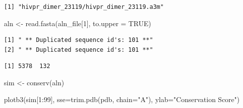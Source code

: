 \documentclass[
  letterpaper,
  DIV=11,
  numbers=noendperiod]{scrartcl}
\newenvironment{Shaded}{\begin{snugshade}}{\end{snugshade}}
\newcommand{\AttributeTok}[1]{\textcolor[rgb]{0.40,0.45,0.13}{#1}}
\newcommand{\ConstantTok}[1]{\textcolor[rgb]{0.56,0.35,0.01}{#1}}
\newcommand{\DecValTok}[1]{\textcolor[rgb]{0.68,0.00,0.00}{#1}}
\newcommand{\FunctionTok}[1]{\textcolor[rgb]{0.28,0.35,0.67}{#1}}
\newcommand{\NormalTok}[1]{\textcolor[rgb]{0.00,0.23,0.31}{#1}}
\newcommand{\OtherTok}[1]{\textcolor[rgb]{0.00,0.23,0.31}{#1}}
\newcommand{\SpecialCharTok}[1]{\textcolor[rgb]{0.37,0.37,0.37}{#1}}
\newcommand{\StringTok}[1]{\textcolor[rgb]{0.13,0.47,0.30}{#1}}
\begin{document}
\begin{Shaded}
\end{Shaded}

\begin{verbatim}
[1] "hivpr_dimer_23119/hivpr_dimer_23119.a3m"
\end{verbatim}

\begin{Shaded}
\begin{Highlighting}[]
\NormalTok{aln }\OtherTok{\textless{}{-}} \FunctionTok{read.fasta}\NormalTok{(aln\_file[}\DecValTok{1}\NormalTok{], }\AttributeTok{to.upper =} \ConstantTok{TRUE}\NormalTok{)}
\end{Highlighting}
\end{Shaded}

\begin{verbatim}
[1] " ** Duplicated sequence id's: 101 **"
[2] " ** Duplicated sequence id's: 101 **"
\end{verbatim}

\begin{Shaded}
\end{Shaded}

\begin{verbatim}
[1] 5378  132
\end{verbatim}

\begin{Shaded}
\begin{Highlighting}[]
\NormalTok{sim }\OtherTok{\textless{}{-}} \FunctionTok{conserv}\NormalTok{(aln)}
\end{Highlighting}
\end{Shaded}

\begin{Shaded}
\begin{Highlighting}[]
\FunctionTok{plotb3}\NormalTok{(sim[}\DecValTok{1}\SpecialCharTok{:}\DecValTok{99}\NormalTok{], }\AttributeTok{sse=}\FunctionTok{trim.pdb}\NormalTok{(pdb, }\AttributeTok{chain=}\StringTok{"A"}\NormalTok{),}
       \AttributeTok{ylab=}\StringTok{"Conservation Score"}\NormalTok{)}
\end{Highlighting}
\end{Shaded}
\end{document}
